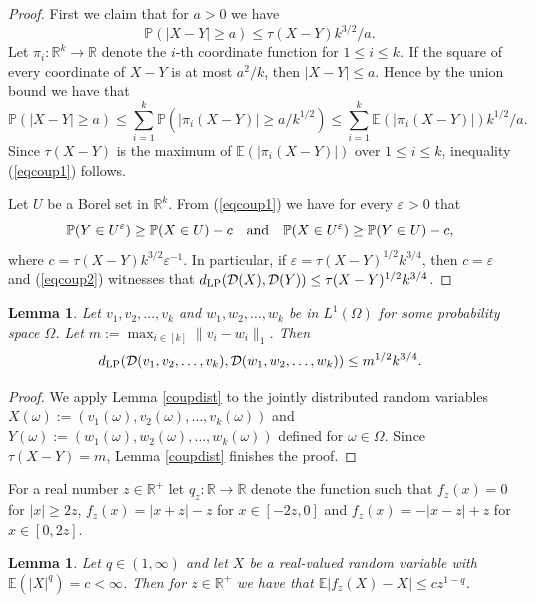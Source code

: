 \documentclass[a4wider]{amsart}
\newtheorem{lemma}[theorem]{Lemma}
\theoremstyle{definitionbreak}\newtheorem{D}[theorem]{Definition}
\theoremstyle{definitionbreak}\newtheorem*{D*}{Definition}
\begin{document}
\begin{proof} First we claim that for $a>0$ we have
\begin{equation}\label{eqcoup1}
\mathbb{P}(|X-Y|\geq a)\leq \tau(X-Y)k^{3/2}/a.
\end{equation}
Let $\pi_i:\mathbb{R}^k\to\mathbb{R}$ denote the $i$-th coordinate function for $1\leq i\leq k$. If the square of every coordinate of $X-Y$ is at most $a^2/k$, then $|X-Y|\leq a$. Hence  by the union bound we have that 
$$\mathbb{P}(|X-Y|\geq a)\leq\sum_{i=1}^k\mathbb{P}(|\pi_i(X-Y)|\geq a/k^{1/2})\leq \sum_{i=1}^k \mathbb{E}(|\pi_i(X-Y)|)k^{1/2}/a.$$ Since $\tau(X-Y)$ is the maximum of $\mathbb{E}(|\pi_i(X-Y)|)$ over $1\leq i\leq k$, inequality (\ref{eqcoup1}) follows.

 Let $U$ be a Borel set in $\mathbb{R}^k$. From (\ref{eqcoup1}) we have for every $\varepsilon>0$ that
\begin{equation}\label{eqcoup2}
\mathbb{P}(Y\in U^\varepsilon)\geq \mathbb{P}(X\in U)-c~~~{\rm and}~~~\mathbb{P}(X\in U^\varepsilon)\geq \mathbb{P}(Y\in U)-c,
\end{equation}
 where $c=\tau(X-Y)k^{3/2}\varepsilon^{-1}$. In particular, if $\varepsilon=\tau(X-Y)^{1/2}k^{3/4}$, then $c=\varepsilon$ and (\ref{eqcoup2}) witnesses that $d_{\rm LP}(\mathcal{D}(X),\mathcal{D}(Y))\leq \tau(X-Y)^{1/2}k^{3/4}$.

\end{proof}

\begin{lemma}\label{coupdist2} Let $v_1,v_2,\dots,v_k$ and $w_1,w_2,\dots,w_k$ be in $L^1(\Omega)$ for some probability space $\Omega$. Let $m:=\max_{i\in [k]} \|v_i-w_i\|_1$. Then
$$d_{\rm LP}(\mathcal{D}(v_1,v_2,\dots,v_k),\mathcal{D}(w_1,w_2,\dots,w_k))\leq m^{1/2}k^{3/4}.$$
\end{lemma} 

\begin{proof} We apply Lemma \ref{coupdist} to the jointly distributed random variables $X(\omega):=(v_1(\omega),v_2(\omega),\dots,v_k(\omega))$ and $Y(\omega):=(w_1(\omega),w_2(\omega),\dots,w_k(\omega))$ defined for $\omega\in\Omega$. Since $\tau(X-Y)=m$, Lemma \ref{coupdist} finishes the proof.
\end{proof}


For a real number $z\in\mathbb{R}^+$ let $q_z:\mathbb{R}\to\mathbb{R}$ denote the function such that $f_z(x)=0$ for $|x|\geq 2z$, $f_z(x)=|x+z|-z$ for $x\in [-2z,0]$ and $f_z(x)=-|x-z|+z$ for $x\in [0,2z]$.

\begin{lemma}\label{closedlem1} Let $q\in (1,\infty)$ and let $X$ be a real-valued random variable with $\mathbb{E}(|X|^q)=c<\infty$. Then for $z\in\mathbb{R}^+$ we have that $\mathbb{E} |f_z(X)-X|\leq cz^{1-q}$.
\end{lemma}
\end{document}
